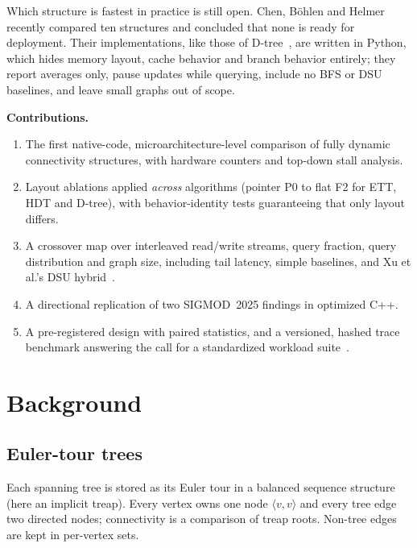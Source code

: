 \documentclass[conference]{IEEEtran}
\begin{document}
Which structure is fastest in practice is still open. Chen, B\"ohlen and Helmer~\cite{chen2025} recently compared ten structures and concluded that none is ready for deployment. Their implementations, like those of D-tree~\cite{chen2022dtree}, are written in Python, which hides memory layout, cache behavior and branch behavior entirely; they report averages only, pause updates while querying, include no BFS or DSU baselines, and leave small graphs out of scope.

\textbf{Contributions.}
\begin{enumerate}
\item The first native-code, microarchitecture-level comparison of fully dynamic connectivity structures, with hardware counters and top-down stall analysis.
\item Layout ablations applied \emph{across} algorithms (pointer P0 to flat F2 for ETT, HDT and D-tree), with behavior-identity tests guaranteeing that only layout differs.
\item A crossover map over interleaved read/write streams, query fraction, query distribution and graph size, including tail latency, simple baselines, and Xu et al.'s DSU hybrid~\cite{xu2024}.
\item A directional replication of two SIGMOD~2025 findings in optimized C++.
\item A pre-registered design with paired statistics, and a versioned, hashed trace benchmark answering the call for a standardized workload suite~\cite{chen2025}.
\end{enumerate}

\section{Background}
\subsection{Euler-tour trees}
Each spanning tree is stored as its Euler tour in a balanced sequence structure (here an implicit treap). Every vertex owns one node $\langle v,v\rangle$ and every tree edge two directed nodes; connectivity is a comparison of treap roots. Non-tree edges are kept in per-vertex sets.
\end{document}

